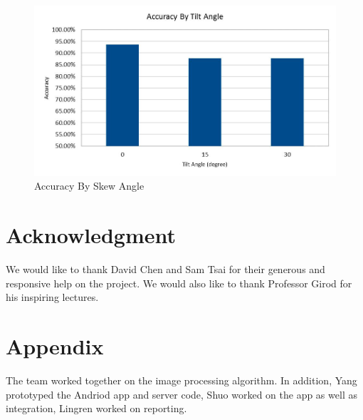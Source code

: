 \documentclass[conference]{IEEEtran}
\begin{document}
\begin{figure}
\center
\includegraphics[scale=0.25]{accuracy_by_angle.jpg}
\caption{Accuracy By Skew Angle}
\label{accuracybyangle}
\end{figure}


\section*{Acknowledgment}
We would like to thank David Chen and Sam Tsai for their generous and responsive help on the project.  We would also like to thank Professor Girod for his inspiring lectures.

\section*{Appendix}
The team worked together on the image processing algorithm.  In addition, Yang prototyped the Andriod app and server code, Shuo worked on the app as well as integration, Lingren worked on reporting.

\end{document}
